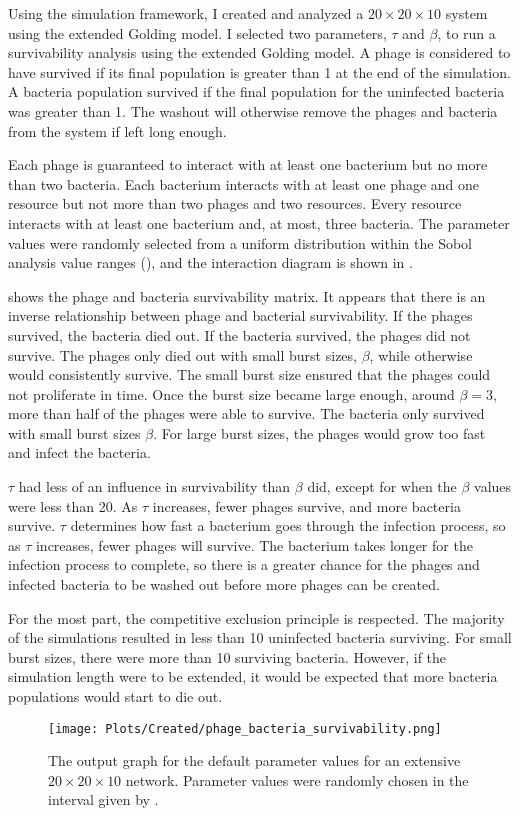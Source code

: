 Using the simulation framework, I created and analyzed a $20\times20\times10$ system using the extended Golding model. 
I selected two parameters, $\tau$ and $\beta$, to run a survivability analysis using the extended Golding model. 
A phage is considered to have survived if its final population is greater than 1 at the end of the simulation. 
A bacteria population survived if the final population for the uninfected bacteria was greater than 1. 
The washout will otherwise remove the phages and bacteria from the system if left long enough. 

Each phage is guaranteed to interact with at least one bacterium but no more than two bacteria. 
Each bacterium interacts with at least one phage and one resource but not more than two phages and two resources. 
Every resource interacts with at least one bacterium and, at most, three bacteria. 
The parameter values were randomly selected from a uniform distribution within the Sobol analysis value ranges (), and the interaction diagram is shown in . 

 shows the phage and bacteria survivability matrix. 
It appears that there is an inverse relationship between phage and bacterial survivability. 
If the phages survived, the bacteria died out. 
If the bacteria survived, the phages did not survive. 
The phages only died out with small burst sizes, $\beta$, while otherwise would consistently survive. The small burst size ensured that the phages could not proliferate in time. 
Once the burst size became large enough, around $\beta = 3$, more than half of the phages were able to survive. 
The bacteria only survived with small burst sizes $\beta$. 
For large burst sizes, the phages would grow too fast and infect the bacteria. 

$\tau$ had less of an influence in survivability than $\beta$ did, except for when the $\beta$ values were less than 20. 
As $\tau$ increases, fewer phages survive, and more bacteria survive. 
$\tau$ determines how fast a bacterium goes through the infection process, so as $\tau$ increases, fewer phages will survive. 
The bacterium takes longer for the infection process to complete, so there is a greater chance for the phages and infected bacteria to be washed out before more phages can be created. 

For the most part, the competitive exclusion principle is respected. 
The majority of the simulations resulted in less than 10 uninfected bacteria surviving. 
For small burst sizes, there were more than 10 surviving bacteria. However, if the simulation length were to be extended, it would be expected that more bacteria populations would start to die out. 

\begin{figure}[]
    \texttt{[image: Plots/Created/phage\_bacteria\_survivability.png]}
    \centering
    \caption{
        The output graph for the default parameter values for an extensive $20\times 20 \times 10$ network. 
        Parameter values were randomly chosen in the interval given by . 
            \label{fig:created:survivability}
    }
\end{figure}
